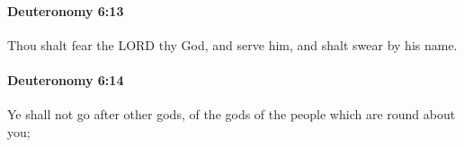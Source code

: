 		\paragraph{Deuteronomy 6:13} %
			\label{DEUTERONOMY-6-13}

			Thou shalt fear the LORD thy God, and serve him, and shalt swear by his name.


		\paragraph{Deuteronomy 6:14} %
			\label{DEUTERONOMY-6-14}

			Ye shall not go after other gods, of the gods of the people which are round about you;


